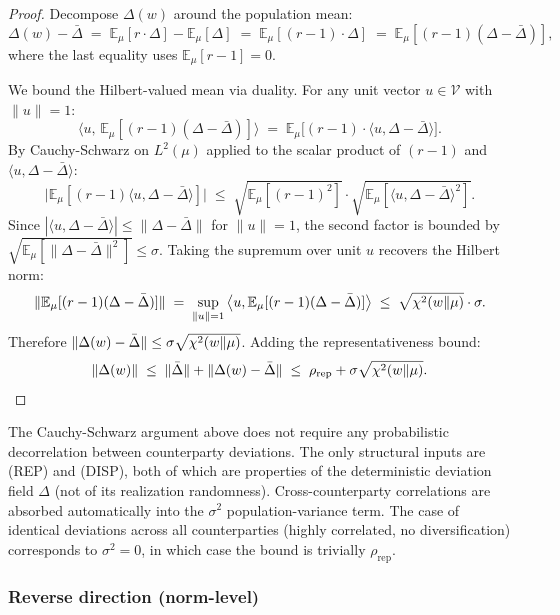 \begin{proof}
Decompose $\Delta(w)$ around the population mean:
\[
  \Delta(w) - \bar\Delta \;=\; \mathbb{E}_\mu[r \cdot \Delta]
  - \mathbb{E}_\mu[\Delta] \;=\; \mathbb{E}_\mu[(r - 1) \cdot \Delta]
  \;=\; \mathbb{E}_\mu[(r - 1)(\Delta - \bar\Delta)],
\]
where the last equality uses $\mathbb{E}_\mu[r - 1] = 0$.

We bound the Hilbert-valued mean via duality. For any unit vector
$u \in \mathcal{V}$ with $\|u\| = 1$:
\[
  \big\langle u, \,\mathbb{E}_\mu[(r - 1)(\Delta - \bar\Delta)] \big\rangle
  \;=\; \mathbb{E}_\mu\big[(r - 1) \cdot \langle u, \Delta - \bar\Delta\rangle\big].
\]
By Cauchy-Schwarz on $L^2(\mu)$ applied to the scalar product of
$(r - 1)$ and $\langle u, \Delta - \bar\Delta\rangle$:
\[
  \big|\mathbb{E}_\mu[(r-1) \langle u, \Delta - \bar\Delta\rangle]\big|
  \;\leq\; \sqrt{\mathbb{E}_\mu[(r-1)^2]} \cdot
  \sqrt{\mathbb{E}_\mu[\langle u, \Delta - \bar\Delta\rangle^2]}.
\]
Since $|\langle u, \Delta - \bar\Delta\rangle| \leq \|\Delta -
\bar\Delta\|$ for $\|u\| = 1$, the second factor is bounded by
$\sqrt{\mathbb{E}_\mu[\|\Delta - \bar\Delta\|^2]} \leq \sigma$.
Taking the supremum over unit $u$ recovers the Hilbert norm:
\[
  \|\mathbb{E}_\mu[(r-1)(\Delta - \bar\Delta)]\|
  \;=\; \sup_{\|u\|=1} \big\langle u, \mathbb{E}_\mu[(r-1)(\Delta - \bar\Delta)]\big\rangle
  \;\leq\; \sqrt{\chi^2(w \|\mu)} \cdot \sigma.
\]
Therefore $\|\Delta(w) - \bar\Delta\| \leq \sigma \sqrt{\chi^2(w
\|\mu)}$. Adding the representativeness bound:
\[
  \|\Delta(w)\| \;\leq\; \|\bar\Delta\| + \|\Delta(w) - \bar\Delta\|
  \;\leq\; \rho_\mathrm{rep} + \sigma \sqrt{\chi^2(w \|\mu)}.
\]
\end{proof}

\begin{remark}
\label{rem:cross-corr-companion}
The Cauchy-Schwarz argument above does not require any
probabilistic decorrelation between counterparty deviations. The
only structural inputs are (REP) and (DISP), both of which are
properties of the deterministic deviation field $\Delta$ (not of
its realization randomness). Cross-counterparty correlations are
absorbed automatically into the $\sigma^2$ population-variance
term. The case of identical deviations across all counterparties
(highly correlated, no diversification) corresponds to
$\sigma^2 = 0$, in which case the bound is trivially
$\rho_\mathrm{rep}$.
\end{remark}

\subsubsection{Reverse direction (norm-level)}

